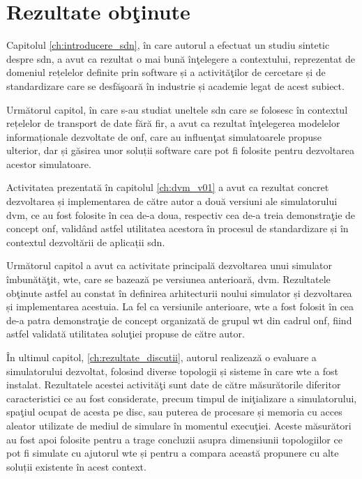 \section{Rezultate obţinute}

Capitolul \ref{ch:introducere_sdn}, în care autorul a efectuat un studiu sintetic despre \gls{sdn}, a avut ca rezultat o mai bună înţelegere a contextului, reprezentat de domeniul rețelelor definite prin software și a activităţilor de cercetare și de standardizare care se desfăşoară în industrie și academie legat de acest subiect. 

Următorul capitol, în care s-au studiat uneltele \gls{sdn} care se folosesc în contextul rețelelor de transport de date fără fir, a avut ca rezultat înţelegerea modelelor informaționale dezvoltate de \gls{onf}, care au influenţat simulatoarele propuse ulterior, dar și găsirea unor soluții software care pot fi folosite pentru dezvoltarea acestor simulatoare.

Activitatea prezentată în capitolul \ref{ch:dvm_v01} a avut ca rezultat concret dezvoltarea și implementarea de către autor a două versiuni ale simulatorului \gls{dvm}, ce au fost folosite în cea de-a doua, respectiv cea de-a treia demonstraţie de concept \gls{onf}, validând astfel utilitatea acestora în procesul de standardizare și în contextul dezvoltării de aplicații \gls{sdn}.

Următorul capitol a avut ca activitate principală dezvoltarea unui simulator îmbunătăţit, \gls{wte}, care se bazează pe versiunea anterioară, \gls{dvm}. Rezultatele obţinute astfel au constat în definirea arhitecturii noului simulator și dezvoltarea și implementarea acestuia. La fel ca versiunile anterioare, \gls{wte} a fost folosit în cea de-a patra demonstraţie de concept organizată de grupul \gls{wt} din cadrul \gls{onf}, fiind astfel validată utilitatea soluţiei propuse de către autor.

În ultimul capitol, \ref{ch:rezultate_discutii}, autorul realizează o evaluare a simulatorului dezvoltat, folosind diverse topologii și sisteme în care \gls{wte} a fost instalat. Rezultatele acestei activităţi sunt date de către măsurătorile diferitor caracteristici ce au fost considerate, precum timpul de iniţializare a simulatorului, spaţiul ocupat de acesta pe disc, sau puterea de procesare și memoria cu acces aleator utilizate de mediul de simulare în momentul execuţiei. Aceste măsurători au fost apoi folosite pentru a trage concluzii asupra dimensiunii topologiilor ce pot fi simulate cu ajutorul \gls{wte} și pentru a compara această propunere cu alte soluții existente în acest context.